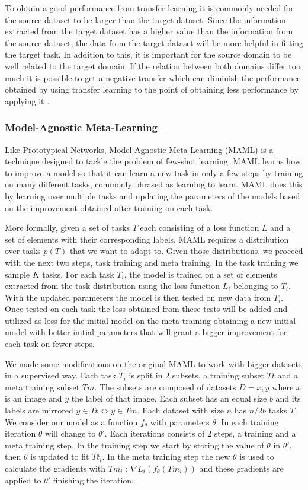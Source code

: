 To obtain a good performance from transfer learning it is commonly needed for the source dataset to be larger than the target dataset. Since the information extracted from the target dataset has a higher value than the information from the source dataset, the data from the target dataset will be more helpful in fitting the target task. In addition to this, it is important for the source domain to be well related to the target domain. If the relation between both domains differ too much it is possible to get a negative transfer which can diminish the performance obtained by using transfer learning to the point of obtaining less performance by applying it \cite{weiss2016}.

\subsubsection{Model-Agnostic Meta-Learning} \label{sec:models:maml}

Like Prototypical Networks, Model-Agnostic Meta-Learning (MAML) \cite{DBLP:journals/corr/FinnAL17} is a technique designed to tackle the problem of few-shot learning. MAML learns how to improve a model so that it can learn a new task in only a few steps by training on many different tasks, commonly phrased as learning to learn. MAML does this by learning over multiple tasks and updating the parameters of the models based on the improvement obtained after training on each task.

More formally, given a set of tasks $T$ each consisting of a loss function $L$ and a set of elements with their corresponding labels. MAML requires a distribution over tasks $p(T)$ that we want to adapt to. Given those distributions, we proceed with the next two steps, task training and meta training. In the task training we sample $K$ tasks. For each task $T_i$, the model is trained on a set of elements extracted from the task distribution using the loss function $L_i$ belonging to $T_i$. With the updated parameters the model is then tested on new data from $T_i$. Once tested on each task the loss obtained from these tests will be added and utilized as loss for the initial model on the meta training obtaining a new initial model with better initial parameters that will grant a bigger improvement for each task on fewer steps.

We made some modifications on the original MAML to work with bigger datasets in a supervised way. Each task $T_i$ is split in 2 subsets, a training subset $Tt$ and a meta training subset $Tm$. The subsets are composed of datasets $D={x,y}$ where $x$ is an image and $y$ the label of that image. Each subset has an equal size $b$ and its labels are mirrored $y\in Tt \iff y\in Tm$. Each dataset with size $n$ has $n/2b$ tasks $T$. We consider our model as a function $f_\theta$ with parameters $\theta$. In each training iteration $\theta$ will change to $\theta'$. Each iterations consists of 2 steps, a training and a meta training step. In the training step we start by storing the value of $\theta$ in $\theta'$, then $\theta$ is updated to fit $Tt_i$. In the meta training step the new $\theta$ is used to calculate the gradients with $Tm_i$ : $\nabla L_i(  f_\theta(Tm_i))$ and these gradients are applied to $\theta'$ finishing the iteration. 

